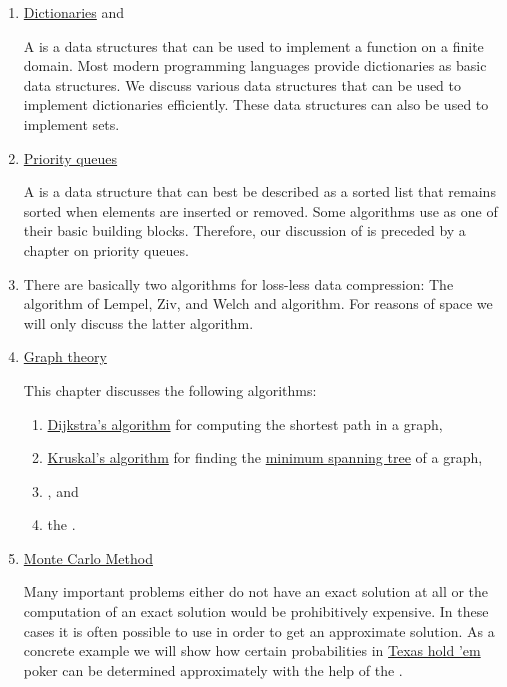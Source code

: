 \begin{enumerate}
\item \href{http://en.wikipedia.org/wiki/Map_(computer_science)}{Dictionaries} and 
  
      A  is a data structures that can be used to implement a function on a finite domain.
      Most modern programming languages provide dictionaries as basic data structures.  We discuss various data
      structures that can be used to implement dictionaries efficiently.   
      These data structures can also be used to implement sets.
\item \href{http://en.wikipedia.org/wiki/Priority_queue}{Priority queues}

      A  is a data structure that can best be described as a sorted list that remains
      sorted when elements are inserted or removed.
      Some  algorithms use  as one of their basic building blocks.
      Therefore, our discussion of  is preceded by a chapter on priority queues.
\item {}

      There are basically two algorithms for loss-less data compression: The algorithm of Lempel, Ziv, and
      Welch and  algorithm.  For reasons of space we will only discuss the latter algorithm.
\item \href{http://en.wikipedia.org/wiki/Graph_theory}{Graph theory}
  
      This chapter discusses the following algorithms:
      \begin{enumerate}
      \item \href{http://en.wikipedia.org/wiki/Dijkstra%27s_algorithm}{Dijkstra's algorithm}
            for computing the shortest path in a graph,
      \item \href{https://en.wikipedia.org/wiki/Kruskal%27s_algorithm}{Kruskal's algorithm} for finding the
            \href{https://en.wikipedia.org/wiki/Minimum_spanning_tree}{minimum spanning tree} of a graph,
      \item {}, and 
      \item the .
      \end{enumerate}
\item \href{http://en.wikipedia.org/wiki/Monte_Carlo_method}{Monte Carlo Method} 
 
      Many important problems either do not have an exact solution at all or the computation of an
      exact solution would be prohibitively expensive.  In these cases it is often possible to use 
       in order to get an approximate solution.  As a concrete example we will show
      how certain probabilities in \href{http://en.wikipedia.org/wiki/Texas_hold_%27em}{Texas hold 'em} 
      poker can be determined approximately with the help of the .
\end{enumerate}
